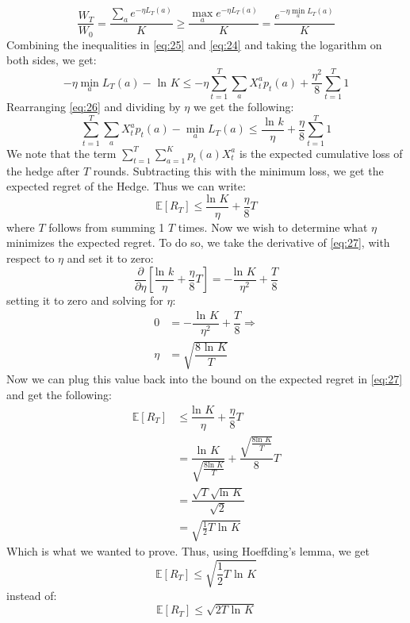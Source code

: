 \documentclass{article}
\begin{document}
\begin{equation}
\label{eq:24}
\dfrac{W_T}{W_0} = \dfrac{\sum\limits_a e^{-\eta L_T(a)}}{K} \geq \dfrac{\max_{a}e^{-\eta L_T(a)}}{K} = \dfrac{e^{-\eta \min_a L_T(a)}}{K}
\end{equation}
Combining the inequalities in \eqref{eq:25} and \eqref{eq:24} and taking the logarithm on both sides, we get: 
\begin{equation}
\label{eq:26}
-\eta \min_a L_T(a) - \text{ ln } K \leq - \eta \sum\limits_{t=1}^T \sum\limits_{a} X_t^ a p_t(a) + \dfrac{\eta^2}{8} \sum\limits_{t=1}^T 1
\end{equation}
Rearranging \eqref{eq:26} and dividing by $\eta$ we get the following:
\begin{equation}
\sum\limits_{t=1}^T \sum\limits_a X_t^a p_t(a) - \min_{a} L_T(a) \leq \dfrac{\text{ ln }k}{\eta} + \dfrac{\eta}{8} \sum\limits_{t=1}^T 1
\end{equation}
We note that the term $\sum_{t=1}^T \sum_{a=1}^K p_t(a) X_t^a$ is the expected cumulative loss of the hedge after $T$ rounds. Subtracting this with the minimum loss, we get the expected regret of the Hedge. Thus we can write: 
\begin{equation}
\label{eq:27}
\mathbb{E}[R_T] \leq \dfrac{\text{ln }K}{\eta}+ \dfrac{\eta}{8}T
\end{equation}
where $T$ follows from summing 1 $T$ times. Now we wish to determine what $\eta$ minimizes the expected regret. To do so, we take the derivative of \eqref{eq:27}, with respect to $\eta$ and set it to zero:
\begin{equation}
\dfrac{\partial}{\partial \eta} \left[ \dfrac{\text{ln }k}{\eta}+ \dfrac{\eta}{8}T \right] = -\dfrac{\text{ln }K}{\eta^2} + \dfrac{T}{8}
\end{equation}
setting it to zero and solving for $\eta$:
\begin{align}
0 &= -\dfrac{\text{ ln }K}{\eta^2} + \dfrac{T}{8} \Rightarrow \\
\eta &= \sqrt{\dfrac{8 \text{ ln }K}{T}}
\end{align}
Now we can plug this value back into the bound on the expected regret in \eqref{eq:27} and get the following:
\begin{align}
\mathbb{E}[R_T] &\leq \dfrac{\text{ln }K}{\eta}+ \dfrac{\eta}{8}T \\
&= \dfrac{\text{ln }K}{\sqrt{\frac{8 \text{ln }K}{T}}}
 + \dfrac{\sqrt{\frac{8 \text{ln }K}{T}}}{8}T \\
&= \dfrac{ \sqrt{T} \sqrt{\text{ln } K }  }{ \sqrt{2}} \\
&= \sqrt{\frac{1}{2} T \text{ ln } K}
\end{align}
Which is what we wanted to prove. Thus, using Hoeffding's lemma, we get
\begin{equation}
\mathbb{E}[R_T] \leq \sqrt{\frac{1}{2} T \text{ ln } K}
\end{equation}
instead of:
\begin{equation}
\mathbb{E}[R_T] \leq \sqrt{2 T \text{ ln } K}
\end{equation}
\end{document}

